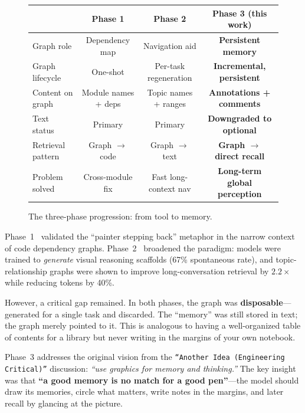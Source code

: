 \documentclass[11pt,a4paper]{article}
\begin{document}
\begin{figure}[h]
\centering\footnotesize
\begin{tabular}{l|c|c|c}
\toprule
& \textbf{Phase 1} & \textbf{Phase 2} & \textbf{Phase 3 (this work)} \\
\midrule
Graph role        & Dependency map     & Navigation aid       & \textbf{Persistent memory} \\
Graph lifecycle   & One-shot           & Per-task regeneration & \textbf{Incremental, persistent} \\
Content on graph  & Module names + deps & Topic names + ranges  & \textbf{Annotations + comments} \\
Text status       & Primary             & Primary              & \textbf{Downgraded to optional} \\
Retrieval pattern & Graph $\rightarrow$ code & Graph $\rightarrow$ text & \textbf{Graph $\rightarrow$ direct recall} \\
Problem solved    & Cross-module fix   & Fast long-context nav & \textbf{Long-term global perception} \\
\bottomrule
\end{tabular}
\caption{The three-phase progression: from tool to memory.}
\label{fig:progression}
\end{figure}

Phase~1~\cite{depgraph2026} validated the ``painter stepping back'' metaphor in the narrow context of code dependency graphs. Phase~2~\cite{cognitivesketch2026} broadened the paradigm: models were trained to \textit{generate} visual reasoning scaffolds (67\% spontaneous rate), and topic-relationship graphs were shown to improve long-conversation retrieval by $2.2\times$ while reducing tokens by 40\%.

However, a critical gap remained. In both phases, the graph was \textbf{disposable}---generated for a single task and discarded. The ``memory'' was still stored in text; the graph merely pointed to it. This is analogous to having a well-organized table of contents for a library but never writing in the margins of your own notebook.

Phase~3 addresses the original vision from the \texttt{``Another Idea (Engineering Critical)''} discussion: \textit{``use graphics for memory and thinking.''} The key insight was that \textbf{``a good memory is no match for a good pen''}---the model should draw its memories, circle what matters, write notes in the margins, and later recall by glancing at the picture.
\end{document}
